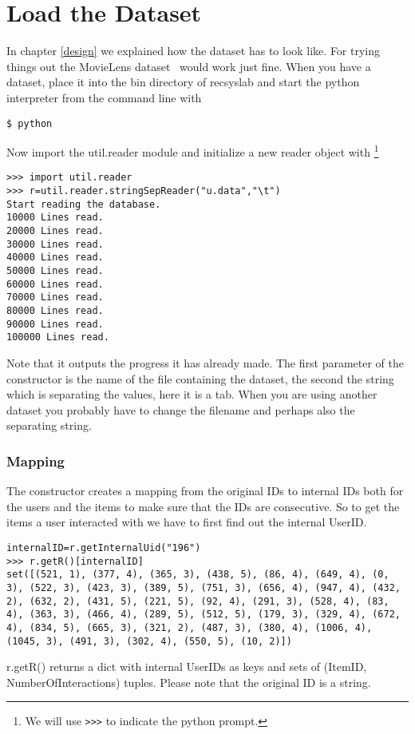 \section{Load the Dataset}
In chapter \ref{design} we explained how the dataset has to look like.
For trying things out the MovieLens dataset~\cite{movielensdatasets} would work just fine.
When you have a dataset, place it into the bin directory of recsyslab and start the
python interpreter from the command line with
\begin{lstlisting}
$ python
\end{lstlisting}
Now import the util.reader module and initialize a new reader object with
\footnote{We will use \lstinline!>>>! to indicate the python prompt.}
\begin{lstlisting}
>>> import util.reader
>>> r=util.reader.stringSepReader("u.data","\t")
Start reading the database.
10000 Lines read.
20000 Lines read.
30000 Lines read.
40000 Lines read.
50000 Lines read.
60000 Lines read.
70000 Lines read.
80000 Lines read.
90000 Lines read.
100000 Lines read.
\end{lstlisting}
Note that it outputs the progress it has already made.
The first parameter of the constructor is the name of the file containing the dataset,
the second the string which is separating the values, here it is a tab. 
When you are using another dataset you probably have to change the filename and perhaps
also the separating string.

\subsubsection*{Mapping}
The constructor creates a mapping from the original IDs to internal IDs both for the users
and the items to make sure that the IDs are consecutive. So to get the items a user interacted
with we have to first find out the internal UserID.
\begin{lstlisting}
internalID=r.getInternalUid("196")
>>> r.getR()[internalID]
set([(521, 1), (377, 4), (365, 3), (438, 5), (86, 4), (649, 4), (0, 3), (522, 3), (423, 3), (389, 5), (751, 3), (656, 4), (947, 4), (432, 2), (632, 2), (431, 5), (221, 5), (92, 4), (291, 3), (528, 4), (83, 4), (363, 3), (466, 4), (289, 5), (512, 5), (179, 3), (329, 4), (672, 4), (834, 5), (665, 3), (321, 2), (487, 3), (380, 4), (1006, 4), (1045, 3), (491, 3), (302, 4), (550, 5), (10, 2)])
\end{lstlisting}
r.getR() returns a dict with internal UserIDs as keys and sets of (ItemID, NumberOfInteractions) tuples.
Please note that the original ID is a string.

